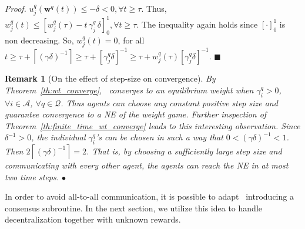 \documentclass{IEEEtran}
\newcommand{\Mcal}[1]{\mathcal{#1}}
\newcommand{\Mc}[1]{\mathcal{#1}}
\newcommand{\bld}[1]{\mathbf{#1}}
\newtheorem{remark}[theorem]{Remark}
\newcommand{\bulletsym}{\hbox{$\bullet$}}
\newcommand{\bulletend}{\relax\ifmmode\else\unskip\hfill\fi\bulletsym}
\newcommand{\squaresym}{\hbox{$\blacksquare$}}
\newcommand{\proofend}{\relax\ifmmode\else\unskip\hfill\fi\squaresym}
\renewenvironment{proof}{\textit{Proof.} }{\proofend}
\newcommand{\marginn}[1]{\marginpar{\color{blue}\tiny\ttfamily#1}}
\newcommand{\margin}[1]{\marginpar{\color{magenta}\tiny\ttfamily#1}}
\def \agt{\Mcal{A}}
\def \tsk{\Mc{Q}}
\def \w{\bld{w}}
\begin{document}
\begin{proof}
  $u^q_j(\w^q(t)) \leq -\delta < 0, %
  \forall t \geq \tau$.
Thus, $w^q_j(t) \leq [ w^q_j(\tau) - t\, \gamma^q_j \, \delta ]_0^1, \forall t \geq \tau.$
The inequality again holds since $[\cdot]_0^1$ is non decreasing. So, $w^q_j(t) = 0$, for all
	$t \geq \tau + \left\lceil(\gamma \delta)^{-1}\right\rceil \geq \tau + [\gamma^q_j \delta ]^{-1} \geq \tau + w^q_j(\tau) [\gamma^q_j \delta]^{-1}$.	
\end{proof}

\begin{remark}[On the effect of step-size on convergence]
  \label{rem:finite_time_two_steps} {\rm By
    Theorem~\ref{th:wt_converge},~
    converges to an equilibrium weight when $\gamma^q_i > 0$,
    $\forall i \in \agt$, $\forall q \in \tsk$. Thus agents can choose
    any constant positive step size and guarantee convergence to a NE
    of the weight game. Further inspection of
    Theorem~\ref{th:finite_time_wt_converge} leads to this interesting
    observation. Since $\delta^{-1} > 0$, the individual
    $\gamma^q_i$'s can be chosen in such a way that
    $0 < {(\gamma\delta)}^{-1} < 1$. Then
    $2\left\lceil(\gamma\delta)^{-1} \right\rceil = 2$. That is, by
    choosing a sufficiently large step size and communicating with
    every other agent, the agents can reach the NE in at most
    \emph{two} time steps. }
\bulletend
\end{remark}

In order to avoid all-to-all communication, it is possible to
adapt~
introducing a consensus subroutine. %
In the next section, we utilize this idea to handle decentralization
together with unknown
rewards. %
\end{document}
